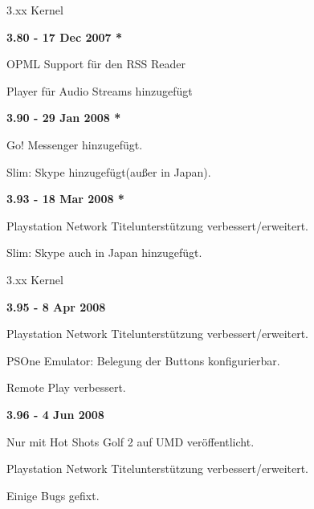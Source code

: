 \documentclass[mode=print,paper=screen,style=jefka]{powerdot}
\begin{document}
\begin{slide}{3.xx Kernel}
	\begin{large}\textbf{3.80 - 17 Dec 2007 *}\end{large}
	\begin{list}{-}{}
		\item{OPML Support für den RSS Reader}
		\item{Player für Audio Streams hinzugefügt}
	\end{list}
	\begin{large}\textbf{3.90 - 29 Jan 2008 *}\end{large}
	\begin{list}{-}{}
		\item{Go! Messenger hinzugefügt.}
		\item{Slim: Skype hinzugefügt(außer in Japan).}
	\end{list}
	\begin{large}\textbf{3.93 - 18 Mar 2008 *}\end{large}
	\begin{list}{-}{}
		\item{Playstation Network Titelunterstützung verbessert/erweitert.}
		\item{Slim: Skype auch in Japan hinzugefügt.}
	\end{list}
\end{slide}

\begin{slide}{3.xx Kernel}
	\begin{large}\textbf{3.95 - 8 Apr 2008}\end{large}
	\begin{list}{-}{}
		\item{Playstation Network Titelunterstützung verbessert/erweitert.}
		\item{PSOne Emulator: Belegung der Buttons konfigurierbar.}
		\item{Remote Play verbessert.}
	\end{list}
	\begin{large}\textbf{3.96 - 4 Jun 2008}\end{large}
	\begin{list}{-}{}
		\item{Nur mit Hot Shots Golf 2 auf UMD veröffentlicht.}
		\item{Playstation Network Titelunterstützung verbessert/erweitert.}
		\item{Einige Bugs gefixt.}
	\end{list}
\end{slide}
\end{document}
